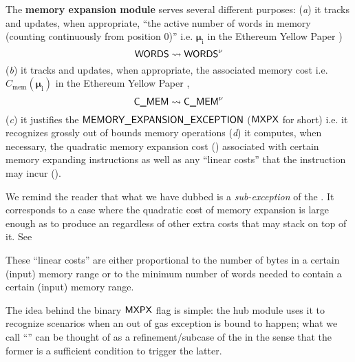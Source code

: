 The \textbf{memory expansion module} serves several different purposes:
(\emph{a})
it tracks and updates, when appropriate, ``the active number of words in memory (counting continuously from position $0$)'' i.e. $\bm{\mu}_\text{i}$ in the Ethereum Yellow Paper )
\[
	\textsf{WORDS}\rightsquigarrow\textsf{WORDS}^{\nu}
\]
(\emph{b})
it tracks and updates, when appropriate, the associated memory cost i.e. $C_\text{mem}(\bm{\mu}_\text{i})$ in the Ethereum Yellow Paper ,
\[
	\textsf{C\_MEM}\rightsquigarrow\textsf{C\_MEM}^{\nu}
\]
(\emph{c})
it justifies the $\textsf{MEMORY\_EXPANSION\_EXCEPTION}$ ($\textsf{MXPX}$ for short) i.e. it recognizes grossly out of bounds memory operations 
(\emph{d})
it computes, when necessary, the quadratic memory expansion cost 
(\mxpQuadGas) associated with certain memory expanding instructions as well as any ``linear costs'' that the instruction may incur 
(\mxpLinGas). 

\saNote{} We remind the reader that what we have dubbed \mxpxSH{} is a \emph{sub-exception} of the \oogxSH{}. It corresponds to a case where the quadratic cost of memory expansion is large enough as to produce an \oogxSH{} regardless of other extra costs that may stack on top of it. See 

\saNote{} These ``linear costs'' are either proportional to the number of bytes in a certain (input) memory range or to the minimum number of  words needed to contain a certain (input) memory range. 

The idea behind the binary $\textsf{MXPX}$ flag is simple: the hub module uses it to recognize scenarios when an out of gas exception is bound to happen; what we call ``\mxpxSH{}'' can be thought of as a refinement/subcase of the \oogxSH{} in the sense that the former is a sufficient condition to trigger the latter.

